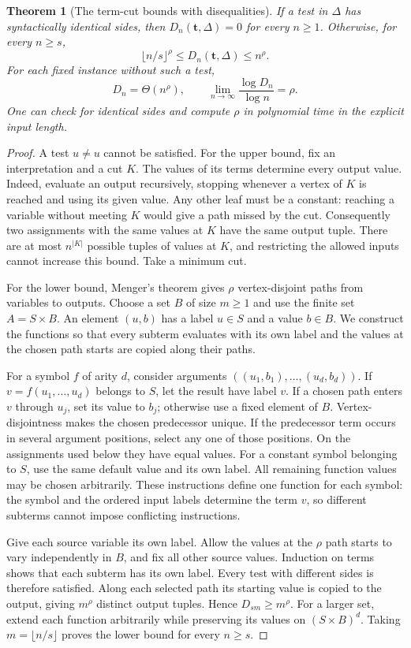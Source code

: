 \documentclass[12pt]{article}
\newtheorem{theorem}{Theorem}[section]
\theoremstyle{definition}
\newcommand{\DD}{D}
\begin{document}
\begin{theorem}[The term-cut bounds with disequalities]\label{thm:cut}
If a test in $\Delta$ has syntactically identical sides, then
$\DD_n(\mathbf t,\Delta)=0$ for every $n\ge1$.
Otherwise, for every $n\ge s$,
\[
 \lfloor n/s\rfloor^\rho\le \DD_n(\mathbf t,\Delta)\le n^\rho.
\]
For each fixed instance without such a test,
\[
 \DD_n=\Theta(n^\rho),\qquad
 \lim_{n\to\infty}\frac{\log\DD_n}{\log n}=\rho.
\]
One can check for identical sides and compute $\rho$ in polynomial time
in the explicit input length.
\end{theorem}
\begin{proof}
A test $u\ne u$ cannot be satisfied. For the upper bound, fix an
interpretation and a cut $K$. The values of its terms determine every
output value. Indeed, evaluate an output recursively, stopping whenever
a vertex of $K$ is reached and using its given value. Any other leaf
must be a constant: reaching a variable without meeting $K$ would give
a path missed by the cut. Consequently two assignments with the same
values at $K$ have the same output tuple. There are at most $n^{|K|}$
possible tuples of values at $K$, and restricting the allowed inputs
cannot increase this bound. Take a minimum cut.

For the lower bound, Menger's theorem gives $\rho$ vertex-disjoint
paths from variables to outputs. Choose a set $B$ of size $m\ge1$ and
use the finite set $A=S\times B$. An element $(u,b)$ has a label
$u\in S$ and a value $b\in B$. We construct the functions so that
every subterm evaluates with its own label and the values at the
chosen path starts are copied along their paths.

For a symbol $f$ of arity $d$, consider arguments
$((u_1,b_1),\ldots,(u_d,b_d))$. If
$v=f(u_1,\ldots,u_d)$ belongs to $S$, let the result have label $v$.
If a chosen path enters $v$ through $u_j$, set its value to $b_j$;
otherwise use a fixed element of $B$. Vertex-disjointness makes the
chosen predecessor unique. If the predecessor term occurs in several
argument positions, select any one of those positions. On the assignments
used below they have equal values. For a constant symbol belonging to $S$, use the same
default value and its own label. All remaining function values may be
chosen arbitrarily. These instructions define one function for each
symbol: the symbol and the ordered input labels determine the term $v$,
so different subterms cannot impose conflicting instructions.

Give each source variable its own label. Allow the values at the
$\rho$ path starts to vary independently in $B$, and fix all other
source values. Induction on terms shows that each subterm has its own
label. Every test with different sides is therefore satisfied. Along
each selected path its starting value is copied to the output, giving
$m^\rho$ distinct output tuples. Hence $\DD_{sm}\ge m^\rho$.
For a larger set, extend each function arbitrarily while preserving
its values on $(S\times B)^d$. Taking $m=\lfloor n/s\rfloor$ proves
the lower bound for every $n\ge s$.


\end{proof}
\end{document}
